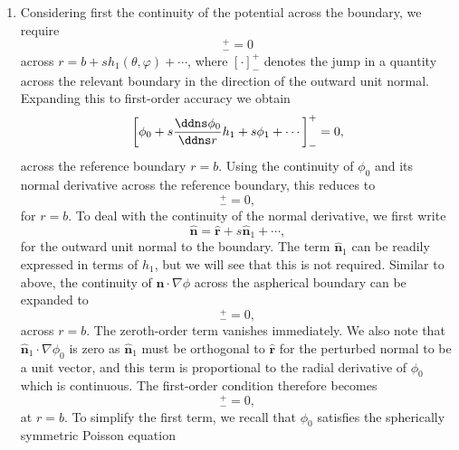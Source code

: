\begin{enumerate}
\item Considering first the continuity of the potential across the boundary, we require
\begin{equation*}
    [\phi]_{-}^{+}=0
\end{equation*}
across $r=b+sh_{1}(\theta,\varphi)+\cdots$, where $[\cdot]_{-}^{+}$ denotes the jump in a quantity across the relevant boundary in the direction of the outward unit normal. Expanding this to first-order accuracy we obtain
\begin{equation*}
    \left[\phi_{0}+s\frac{\ddns\phi_{0}}{\ddns r}h_{1}+s\phi_{1}+\cdots\right]_{-}^{+}=0,
\end{equation*}
across the reference boundary $r=b$. Using the continuity of $\phi_{0}$ and its normal derivative across the reference boundary, this reduces to
\begin{equation*}
    [\phi_{1}]_{-}^{+}=0,
\end{equation*}
for $r=b$. To deal with the continuity of the normal derivative, we first write
\begin{equation*}
    \hat{\mathbf{n}}=\hat{\mathbf{r}}+s\hat{\mathbf{n}}_{1}+\cdots,
\end{equation*}
for the outward unit normal to the boundary. The term $\hat{\mathbf{n}}_{1}$ can be readily expressed in terms of $h_{1}$, but we will see that this is not required. Similar to above, the continuity of $\hat{\mathbf{n}}\cdot\nabla\phi$ across the aspherical boundary can be expanded to
\begin{equation*}
    [\hat{\mathbf{r}}\cdot\nabla\phi_{0}+s(\hat{\mathbf{r}}\cdot\nabla)(\hat{\mathbf{r}}\cdot\nabla\phi_{0})h_{1}+s\hat{\mathbf{n}}_{1}\cdot\nabla\phi_{0}+s\hat{\mathbf{r}}\cdot\nabla\phi_{1}+\cdots]_{-}^{+}=0,
\end{equation*}
across $r=b$. The zeroth-order term vanishes immediately. We also note that $\hat{\mathbf{n}}_{1}\cdot\nabla\phi_{0}$ is zero as $\hat{\mathbf{n}}_{1}$ must be orthogonal to $\hat{\mathbf{r}}$ for the perturbed normal to be a unit vector, and this term is proportional to the radial derivative of $\phi_{0}$ which is continuous. The first-order condition therefore becomes
\begin{equation*}
    [(\hat{\mathbf{r}}\cdot\nabla)(\hat{\mathbf{r}}\cdot\nabla\phi_{0})h_{1}+\hat{\mathbf{r}}\cdot\nabla\phi_{1}]_{-}^{+}=0,
\end{equation*}
at $r=b$. To simplify the first term, we recall that $\phi_{0}$ satisfies the spherically symmetric Poisson equation

\end{enumerate}

